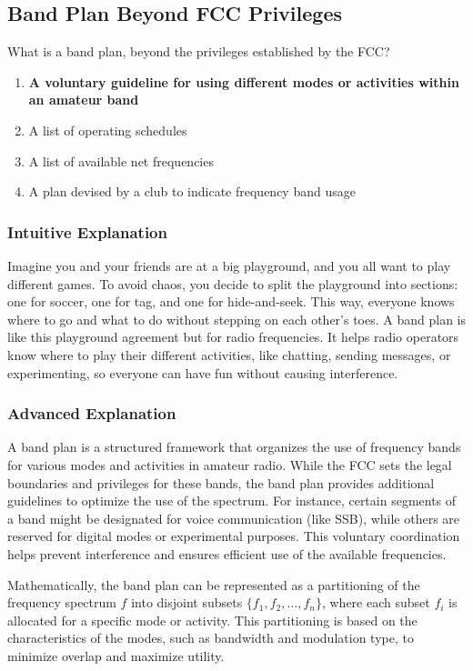 \subsection{Band Plan Beyond FCC Privileges}
\label{T2A10}

\begin{tcolorbox}[colback=gray!10!white,colframe=black!75!black,title=T2A10]
What is a band plan, beyond the privileges established by the FCC?
\begin{enumerate}[label=\Alph*.]
    \item \textbf{A voluntary guideline for using different modes or activities within an amateur band}
    \item A list of operating schedules
    \item A list of available net frequencies
    \item A plan devised by a club to indicate frequency band usage
\end{enumerate}
\end{tcolorbox}

\subsubsection{Intuitive Explanation}
Imagine you and your friends are at a big playground, and you all want to play different games. To avoid chaos, you decide to split the playground into sections: one for soccer, one for tag, and one for hide-and-seek. This way, everyone knows where to go and what to do without stepping on each other's toes. A band plan is like this playground agreement but for radio frequencies. It helps radio operators know where to play their different activities, like chatting, sending messages, or experimenting, so everyone can have fun without causing interference.

\subsubsection{Advanced Explanation}
A band plan is a structured framework that organizes the use of frequency bands for various modes and activities in amateur radio. While the FCC sets the legal boundaries and privileges for these bands, the band plan provides additional guidelines to optimize the use of the spectrum. For instance, certain segments of a band might be designated for voice communication (like SSB), while others are reserved for digital modes or experimental purposes. This voluntary coordination helps prevent interference and ensures efficient use of the available frequencies. 

Mathematically, the band plan can be represented as a partitioning of the frequency spectrum \( f \) into disjoint subsets \( \{f_1, f_2, \dots, f_n\} \), where each subset \( f_i \) is allocated for a specific mode or activity. This partitioning is based on the characteristics of the modes, such as bandwidth and modulation type, to minimize overlap and maximize utility.

